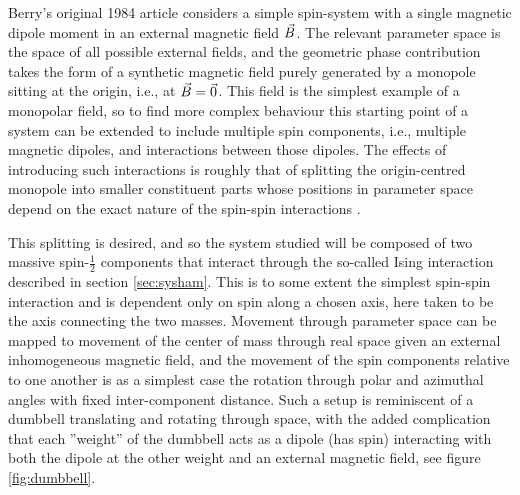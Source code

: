 \documentclass[main.tex]{subfiles}
\begin{document}
\label{sec:aselsys}
Berry's original 1984 article considers a simple spin-system with a single magnetic dipole
moment in an external magnetic field \(\vec{B}\). The relevant parameter space is the space of all
possible external fields, and the geometric phase contribution takes the form of a
synthetic magnetic field purely generated by a monopole sitting at the origin, i.e., at
\(\vec{B} = \vec{0}\). This field is the simplest example of a monopolar field,
so to find more complex behaviour this starting point of a system can be extended to
include multiple spin components, i.e., multiple magnetic dipoles, and interactions between
those dipoles. The effects of introducing such interactions is roughly that of splitting
the origin-centred monopole into smaller constituent parts whose positions in parameter space
depend on the exact nature of the spin-spin interactions \cite{eriksson}.

This splitting is desired, and so the system studied will be composed of two massive
spin-\(\frac{1}{2}\) components that interact through the so-called Ising interaction
described in section \ref{sec:sysham}. This is to some extent the simplest spin-spin
interaction and is dependent only on spin along a chosen axis, here taken to be the axis
connecting the two masses. Movement through
parameter space can be mapped to movement of the center of mass through real space given an external
inhomogeneous magnetic field, and the movement of the spin components relative to one another is as
a simplest case the rotation through polar and azimuthal angles with fixed inter-component
distance. Such a setup is reminiscent of a dumbbell translating and rotating through space,
with the added complication that each ''weight'' of the dumbbell acts as a dipole (has
spin) interacting with both the dipole at the other weight and an external magnetic field,
see figure \ref{fig:dumbbell}.
\end{document}

